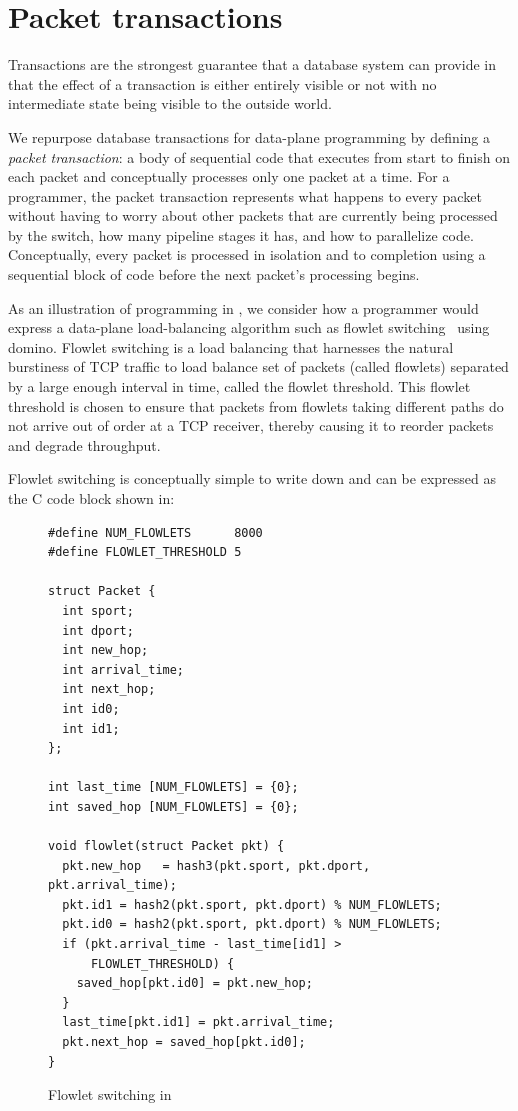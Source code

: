 \section{Packet transactions}
\label{s:transactions}
Transactions are the strongest guarantee that a database system can provide in
that the effect of a transaction is either entirely visible or not with no
intermediate state being visible to the outside world.

We repurpose database transactions for data-plane programming by defining a
\textit{packet transaction}: a body of sequential code that executes from start
to finish on each packet and conceptually processes only one packet at a time.
For a programmer, the packet transaction represents what happens to every
packet without having to worry about other packets that are currently being
processed by the switch, how many pipeline stages it has, and how to
parallelize code. Conceptually, every packet is processed in isolation and to
completion using a sequential block of code before the next packet's processing
begins.

As an illustration of programming in \pktlanguage, we consider how a programmer
would express a data-plane load-balancing algorithm such as flowlet
switching~\cite{flowlet} using domino. Flowlet switching is a load balancing
that harnesses the natural burstiness of TCP traffic to load balance set of
packets (called flowlets) separated by a large enough interval in time, called
the flowlet threshold. This flowlet threshold is chosen to ensure that packets
from flowlets taking different paths do not arrive out of order at a TCP
receiver, thereby causing it to reorder packets and degrade throughput.

Flowlet switching is conceptually simple to write down and can be expressed
as the C code block shown in:
\begin{figure}[!h]
\begin{tiny}
\begin{lstlisting}
#define NUM_FLOWLETS      8000
#define FLOWLET_THRESHOLD 5

struct Packet {
  int sport;
  int dport;
  int new_hop;
  int arrival_time;
  int next_hop;
  int id0;
  int id1;
};

int last_time [NUM_FLOWLETS] = {0};
int saved_hop [NUM_FLOWLETS] = {0};

void flowlet(struct Packet pkt) {
  pkt.new_hop   = hash3(pkt.sport, pkt.dport, pkt.arrival_time);
  pkt.id1 = hash2(pkt.sport, pkt.dport) % NUM_FLOWLETS;
  pkt.id0 = hash2(pkt.sport, pkt.dport) % NUM_FLOWLETS;
  if (pkt.arrival_time - last_time[id1] >
      FLOWLET_THRESHOLD) {
    saved_hop[pkt.id0] = pkt.new_hop;
  }
  last_time[pkt.id1] = pkt.arrival_time;
  pkt.next_hop = saved_hop[pkt.id0];
}
\end{lstlisting}
\end{tiny}
\caption{Flowlet switching in \pktlanguage}
\label{fig:flowlet}
\end{figure}


